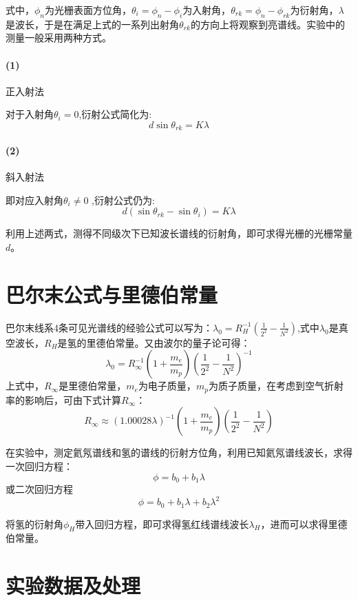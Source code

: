 \documentclass[8pt,a4paper,nocap]{ctexart}
\begin{document}
	 式中，\(\phi_n\)为光栅表面方位角，\(\theta_i = \phi
		 _n - \phi_i\)为入射角，\(\theta_{rk} = \phi_n - \phi_{rk}\)为衍射角，\(\lambda\)是波长，于是在满足上式的一系列出射角\(\theta_{rk}\)的方向上将观察到亮谱线。实验中的测量一般采用两种方式。
		 \paragraph{(1)}正入射法
		 
		 对于入射角\(\theta_i = 0\),衍射公式简化为:\[d\sin\theta_{rk} = K\lambda\]
		 \paragraph{(2)}斜入射法
		 
		 即对应入射角\(\theta_i \neq 0\) ,衍射公式仍为:\[d(\sin\theta_{rk} - \sin\theta_i) = K\lambda \]
		 
		 利用上述两式，测得不同级次下已知波长谱线的衍射角，即可求得光栅的光栅常量\(d\)。
		\section{巴尔末公式与里德伯常量}
		巴尔末线系4条可见光谱线的经验公式可以写为：\(\displaystyle \lambda_0 = R_H^{-1}\left(\frac{1}{2^2} - \frac{1}{N^2}\right)\),式中\(\lambda_0\)是真空波长，\(R_H\)是氢的里德伯常量。又由波尔的量子论可得：\[\lambda_0 = R_{\infty}^{-1}(1 + \frac{m_e}{m_p})(\frac{1}{2^2} - \frac{1}{N^2})^{-1}\]
		上式中，\(R_\infty\)是里德伯常量，\(m_e\)为电子质量，\(m_p\)为质子质量，在考虑到空气折射率的影响后，可由下式计算\(R_\infty\)：
		\[R_\infty \approx (1.00028\lambda)^{-1}(1 + \frac{m_e}{m_p})\left(\frac{1}{2^2} - \frac{1}{N^2}\right)\]
		
		在实验中，测定氦氖谱线和氢的谱线的衍射方位角，利用已知氦氖谱线波长，求得一次回归方程：\[\phi =b_0 + b_1\lambda\]
		或二次回归方程\[\phi = b_0 + b_1\lambda + b_2\lambda^2\]
		
		将氢的衍射角\(\phi_H\)带入回归方程，即可求得氢红线谱线波长\(\lambda_H\)，进而可以求得里德伯常量。
		\section{实验数据及处理}
\end{document}
